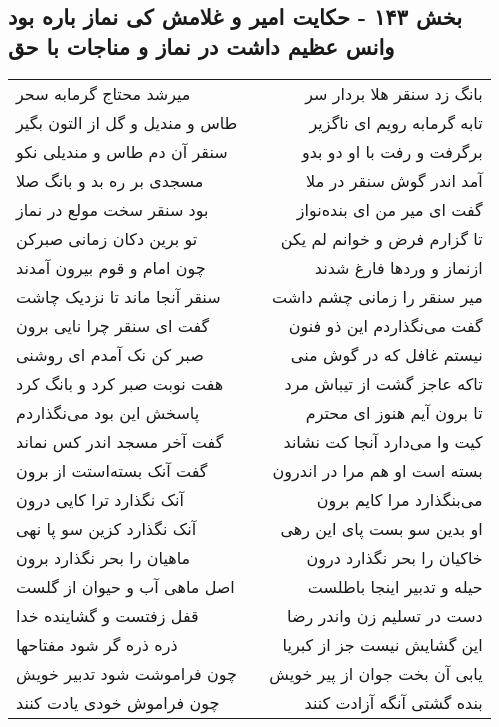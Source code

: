 \begin{center}
\section*{بخش ۱۴۳ - حکایت امیر و غلامش کی نماز باره بود وانس عظیم داشت در نماز و مناجات با حق}
\label{sec:sh143}
\begin{longtable}{l p{0.5cm} r}
میرشد محتاج گرمابه سحر
&&
بانگ زد سنقر هلا بردار سر
\\
طاس و مندیل و گل از التون بگیر
&&
تابه گرمابه رویم ای ناگزیر
\\
سنقر آن دم طاس و مندیلی نکو
&&
برگرفت و رفت با او دو بدو
\\
مسجدی بر ره بد و بانگ صلا
&&
آمد اندر گوش سنقر در ملا
\\
بود سنقر سخت مولع در نماز
&&
گفت ای میر من ای بنده‌نواز
\\
تو برین دکان زمانی صبرکن
&&
تا گزارم فرض و خوانم لم یکن
\\
چون امام و قوم بیرون آمدند
&&
ازنماز و وردها فارغ شدند
\\
سنقر آنجا ماند تا نزدیک چاشت
&&
میر سنقر را زمانی چشم داشت
\\
گفت ای سنقر چرا نایی برون
&&
گفت می‌نگذاردم این ذو فنون
\\
صبر کن نک آمدم ای روشنی
&&
نیستم غافل که در گوش منی
\\
هفت نوبت صبر کرد و بانگ کرد
&&
تاکه عاجز گشت از تیباش مرد
\\
پاسخش این بود می‌نگذاردم
&&
تا برون آیم هنوز ای محترم
\\
گفت آخر مسجد اندر کس نماند
&&
کیت وا می‌دارد آنجا کت نشاند
\\
گفت آنک بسته‌استت از برون
&&
بسته است او هم مرا در اندرون
\\
آنک نگذارد ترا کایی درون
&&
می‌بنگذارد مرا کایم برون
\\
آنک نگذارد کزین سو پا نهی
&&
او بدین سو بست پای این رهی
\\
ماهیان را بحر نگذارد برون
&&
خاکیان را بحر نگذارد درون
\\
اصل ماهی آب و حیوان از گلست
&&
حیله و تدبیر اینجا باطلست
\\
قفل زفتست و گشاینده خدا
&&
دست در تسلیم زن واندر رضا
\\
ذره ذره گر شود مفتاحها
&&
این گشایش نیست جز از کبریا
\\
چون فراموشت شود تدبیر خویش
&&
یابی آن بخت جوان از پیر خویش
\\
چون فراموش خودی یادت کنند
&&
بنده گشتی آنگه آزادت کنند
\\
\end{longtable}
\end{center}
